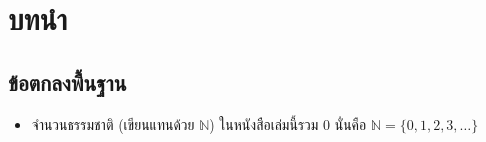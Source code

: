 \chapter{บทนำ}

\section{ข้อตกลง{\wbr}พื้นฐาน}

\begin{itemize}
\item จำนวน{\wbr}ธรรมชาติ (เขียน{\wbr}แทน{\wbr}ด้วย $\mathbb N$) ใน{\wbr}หนังสือ{\wbr}เล่ม{\wbr}นี้{\wbr}รวม 0  นั่น{\wbr}คือ ${\mathbb N} = \{0,1,2,3,\ldots\}$
\end{itemize}
